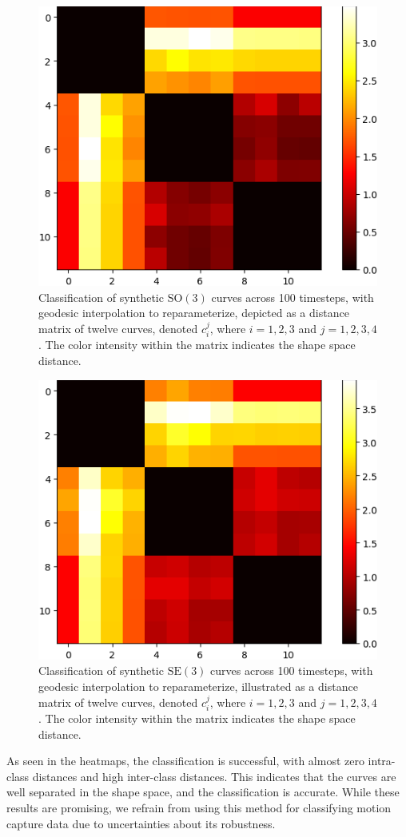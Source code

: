 \begin{figure}[!ht]
    \centering
    \includegraphics[width=0.6\linewidth]{figures/syntetic_data/distance_matrix/SO3_interpolation}
    \caption[Classification using interpolation to reparameterization of curves in \(\mathrm{SO}(3)\)]{Classification of synthetic \(\mathrm{SO}(3)\) curves across 100 timesteps, with geodesic interpolation to reparameterize, depicted as a distance matrix of twelve curves, denoted \(c_i^j\), where \(i = 1, 2, 3\) and \(j = 1, 2, 3, 4\). The color intensity within the matrix indicates the shape space distance.}
    \label{fig:classification-SO3-interpolation}
\end{figure}

\begin{figure}[!ht]
    \centering
    \includegraphics[width=0.6\linewidth]{figures/syntetic_data/distance_matrix/SE3_interpolation}
    \caption[Classification using interpolation to reparameterization of curves in \(\mathrm{SE}(3)\)]{Classification of synthetic \(\mathrm{SE}(3)\) curves across 100 timesteps, with geodesic interpolation to reparameterize, illustrated as a distance matrix of twelve curves, denoted \(c_i^j\), where \(i = 1, 2, 3\) and \(j = 1, 2, 3, 4\). The color intensity within the matrix indicates the shape space distance.}
    \label{fig:classification-SE3-interpolation}
\end{figure}

\FloatBarrier
As seen in the heatmaps, the classification is successful, with almost zero intra-class distances and high inter-class distances. This indicates that the curves are well separated in the shape space, and the classification is accurate. While these results are promising, we refrain from using this method for classifying motion capture data due to uncertainties about its robustness.